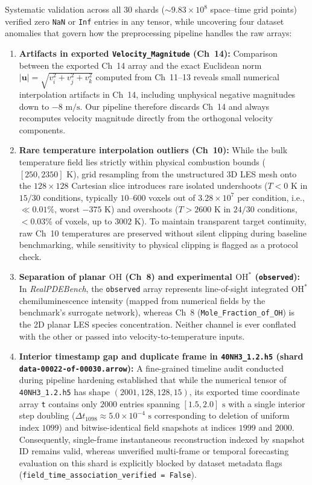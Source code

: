 Systematic validation across all $30$ shards ($\sim 9.83 \times 10^8$ space--time grid points) verified zero \texttt{NaN} or \texttt{Inf} entries in any tensor, while uncovering four dataset anomalies that govern how the preprocessing pipeline handles the raw arrays:
\begin{enumerate}
    \item \textbf{Artifacts in exported \texttt{Velocity\_Magnitude} (Ch~14):} Comparison between the exported Ch~14 array and the exact Euclidean norm $|\mathbf{u}| = \sqrt{v_i^2 + v_j^2 + v_k^2}$ computed from Ch~11--13 reveals small numerical interpolation artifacts in Ch~14, including unphysical negative magnitudes down to $-8\text{ m/s}$. Our pipeline therefore discards Ch~14 and always recomputes velocity magnitude directly from the orthogonal velocity components.
    \item \textbf{Rare temperature interpolation outliers (Ch~10):} While the bulk temperature field lies strictly within physical combustion bounds ($[250, 2350]\text{ K}$), grid resampling from the unstructured 3D LES mesh onto the $128 \times 128$ Cartesian slice introduces rare isolated undershoots ($T < 0\text{ K}$ in $15/30$ conditions, typically $10\text{--}600$ voxels out of $3.28 \times 10^7$ per condition, i.e., $\ll 0.01\%$, worst $-375\text{ K}$) and overshoots ($T > 2600\text{ K}$ in $24/30$ conditions, $< 0.03\%$ of voxels, up to $3002\text{ K}$). To maintain transparent target continuity, raw Ch~10 temperatures are preserved without silent clipping during baseline benchmarking, while sensitivity to physical clipping is flagged as a protocol check.
    \item \textbf{Separation of planar $\text{OH}$ (Ch~8) and experimental $\text{OH}^*$ (\texttt{observed}):} In \textit{RealPDEBench}, the \texttt{observed} array represents line-of-sight integrated $\text{OH}^*$ chemiluminescence intensity (mapped from numerical fields by the benchmark's surrogate network), whereas Ch~8 (\texttt{Mole\_Fraction\_of\_OH}) is the 2D planar LES species concentration. Neither channel is ever conflated with the other or passed into velocity-to-temperature inputs.
    \item \textbf{Interior timestamp gap and duplicate frame in \texttt{40NH3\_1.2.h5} (shard \texttt{data-00022-of-00030.arrow}):} A fine-grained timeline audit conducted during pipeline hardening established that while the numerical tensor of \texttt{40NH3\_1.2.h5} has shape $(2001, 128, 128, 15)$, its exported time coordinate array \texttt{t} contains only $2000$ entries spanning $[1.5, 2.0]\text{ s}$ with a single interior step doubling ($\Delta t_{1098} \approx 5.0 \times 10^{-4}\text{ s}$ corresponding to deletion of uniform index $1099$) and bitwise-identical field snapshots at indices $1999$ and $2000$. Consequently, single-frame instantaneous reconstruction indexed by snapshot ID remains valid, whereas unverified multi-frame or temporal forecasting evaluation on this shard is explicitly blocked by dataset metadata flags (\texttt{field\_time\_association\_verified = False}).
\end{enumerate}

